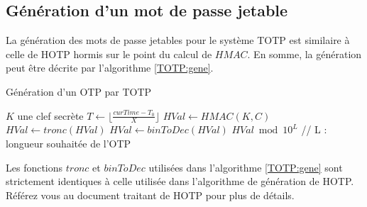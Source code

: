 \documentclass{../res/univ-projet}
\begin{document}
  \subsection{Génération d'un mot de passe jetable}
    La génération des mots de passe jetables pour le système \og{}TOTP\fg{} est similaire à celle de \og{}HOTP\fg{} hormis sur le point du calcul de $HMAC$. En somme, la 
    génération peut être décrite par l'algorithme \ref{TOTP:gene}.
    \begin{algorithm}
      \caption{Génération d'un OTP par TOTP}
      \label{TOTP:gene}
   
      \begin{algorithmic}
        \REQUIRE $K$ une clef secrète
        \STATE $T \leftarrow \lfloor{}\frac{curTime - T_0}{X}\rfloor{}$
        \STATE $HVal \leftarrow HMAC(K, C)$
        \STATE $HVal \leftarrow tronc(HVal)$
        \STATE $HVal \leftarrow binToDec(HVal)$
        \newline
        \RETURN $HVal \bmod 10^L$ // L : longueur souhaitée de l'OTP
      \end{algorithmic}
    \end{algorithm}
    
    Les fonctions $tronc$ et $binToDec$ utilisées dans l'algorithme \ref{TOTP:gene} sont strictement identiques à celle utilisée dans l'algorithme de génération de 
    \og{}HOTP\fg{}. Référez vous au document traitant de \og{}HOTP\fg{} pour plus de détails.
    
\end{document}
